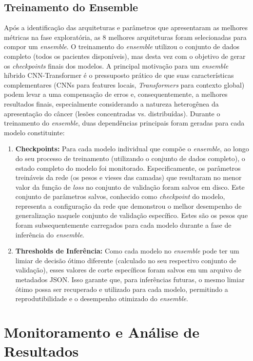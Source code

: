 \subsection{Treinamento do Ensemble}\label{subsec:met_treino_ensemble}
Após a identificação das arquiteturas e parâmetros que apresentaram as melhores métricas na fase exploratória, as 8 melhores arquiteturas foram selecionadas para compor um \textit{ensemble}. O treinamento do \textit{ensemble} utilizou o conjunto de dados completo (todos os pacientes disponíveis), mas desta vez com o objetivo de gerar os \textit{checkpoints} finais dos modelos.
A principal motivação para um \textit{ensemble} híbrido CNN-Transformer é o pressuposto prático de que suas características complementares (CNNs para features locais, \textit{Transformers} para contexto global) podem levar a uma compensação de erros e, consequentemente, a melhores resultados finais, especialmente considerando a natureza heterogênea da apresentação do câncer (lesões concentradas vs. distribuídas).
Durante o treinamento do \textit{ensemble}, duas dependências principais foram geradas para cada modelo constituinte:
\begin{enumerate}
    \item \textbf{Checkpoints:} Para cada modelo individual que compõe o \textit{ensemble}, ao longo do seu processo de treinamento (utilizando o conjunto de dados completo), o estado completo do modelo foi monitorado. Especificamente, os parâmetros treináveis da rede (os pesos e vieses das camadas) que resultaram no menor valor da função de \textit{loss} no conjunto de validação foram salvos em disco. Este conjunto de parâmetros salvos, conhecido como \textit{checkpoint} do modelo, representa a configuração da rede que demonstrou o melhor desempenho de generalização naquele conjunto de validação específico. Estes são os pesos que foram subsequentemente carregados para cada modelo durante a fase de inferência do \textit{ensemble}.
    \item \textbf{Thresholds de Inferência:} Como cada modelo no \textit{ensemble} pode ter um limiar de decisão ótimo diferente (calculado no seu respectivo conjunto de validação), esses valores de corte específicos foram salvos em um arquivo de metadados JSON. Isso garante que, para inferências futuras, o mesmo limiar ótimo possa ser recuperado e utilizado para cada modelo, permitindo a reprodutibilidade e o desempenho otimizado do \textit{ensemble}.
\end{enumerate}

\section{Monitoramento e Análise de Resultados}\label{sec:met_monitor_analise}

